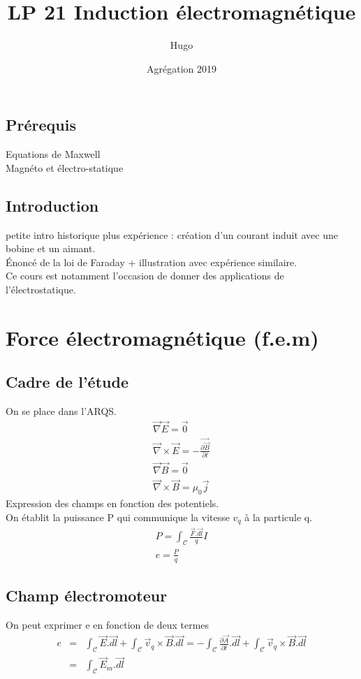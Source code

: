 \documentclass[12pt,prb,aps,epsf]{article}
\begin{document}
	
	\title{LP 21 Induction électromagnétique}
	\author{Hugo}
	\date{Agrégation 2019}
	
	\maketitle
	
	\tableofcontents
	
	\pagebreak
	
\subsection*{Prérequis}
Equations de Maxwell\\
Magnéto et électro-statique

\subsection{Introduction}
petite intro historique plus expérience : création d'un courant induit avec une bobine et un aimant.\\
Énoncé de la loi de Faraday + illustration avec expérience similaire.\\
Ce cours est notamment l'occasion de donner des applications de l'électrostatique.
	
\section{Force électromagnétique (f.e.m)}

\subsection{Cadre de l'étude}
On se place dans l'ARQS. 
\begin{eqnarray}
\vec{\nabla}\vec{E} = \vec{0}\\
\vec{\nabla}\times\vec{E} = -\frac{\vec{\partial\vec{B}}}{\partial t}\\
\vec{\nabla}\vec{B} = \vec{0}\\
\vec{\nabla}\times\vec{B} = \mu_0\vec{j}
\end{eqnarray}
Expression des champs en fonction des potentiels.\\
On établit la puissance P qui communique la vitesse $v_q$ à la particule q.
\begin{eqnarray}
P = \int_{\mathcal{C}} \frac{\vec{F}.\vec{dl}}{q}I\\
e = \frac{P}{q}
\end{eqnarray}
\subsection{Champ électromoteur}
On peut exprimer e en fonction de deux termes 
\begin{eqnarray}
e &=& \int_{\mathcal{C}} \vec{E}.\vec{dl} + \int_{\mathcal{C}} \vec{v}_q\times\vec{B}.\vec{dl} = - \int_{\mathcal{C}} \frac{\partial\vec{A}}{\partial t}.\vec{dl} + \int_{\mathcal{C}} \vec{v}_q\times\vec{B}.\vec{dl} \\
&=& \int_{\mathcal{C}} \vec{E}_m.\vec{dl}
\end{eqnarray}
\end{document}
